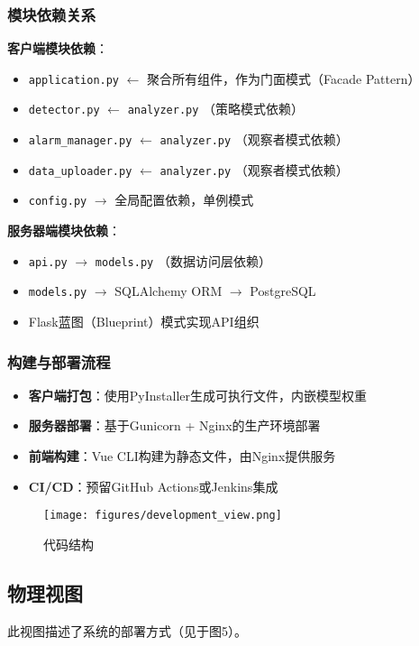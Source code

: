 \documentclass[a4paper,12pt]{article}
\begin{document}
\subsubsection{模块依赖关系}
\textbf{客户端模块依赖}：
\begin{itemize}
  \item \texttt{application.py} $\leftarrow$ 聚合所有组件，作为门面模式（Facade Pattern）
  \item \texttt{detector.py} $\leftarrow$ \texttt{analyzer.py} （策略模式依赖）
  \item \texttt{alarm\_manager.py} $\leftarrow$ \texttt{analyzer.py} （观察者模式依赖）
  \item \texttt{data\_uploader.py} $\leftarrow$ \texttt{analyzer.py} （观察者模式依赖）
  \item \texttt{config.py} $\rightarrow$ 全局配置依赖，单例模式
\end{itemize}

\textbf{服务器端模块依赖}：
\begin{itemize}
  \item \texttt{api.py} $\rightarrow$ \texttt{models.py} （数据访问层依赖）
  \item \texttt{models.py} $\rightarrow$ SQLAlchemy ORM $\rightarrow$ PostgreSQL
  \item Flask蓝图（Blueprint）模式实现API组织
\end{itemize}

\subsubsection{构建与部署流程}
\begin{itemize}
  \item \textbf{客户端打包}：使用PyInstaller生成可执行文件，内嵌模型权重
  \item \textbf{服务器部署}：基于Gunicorn + Nginx的生产环境部署
  \item \textbf{前端构建}：Vue CLI构建为静态文件，由Nginx提供服务
  \item \textbf{CI/CD}：预留GitHub Actions或Jenkins集成
\end{itemize}

\begin{figure}[h]
  \centering
  \texttt{[image: figures/development\_view.png]}
  \caption{代码结构}
  \label{fig:development_view}
\end{figure}

\subsection{物理视图}
此视图描述了系统的部署方式（见于图5）。
\end{document}
